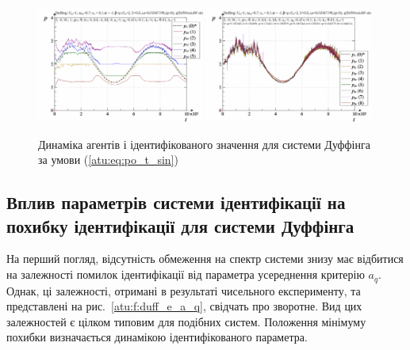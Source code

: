 \begin{figure}[ht!]
\begin{center}
  \includegraphics[width=0.49\textwidth]{p/cha/duff/duff_id-p_t_pi_ql3rlWvnAAW_sin.png}
  \hfill
  \includegraphics[width=0.49\textwidth]{p/cha/duff/duff_id-p_t_p_ql3rlWvnAAW_sin.png}
\end{center}
\caption{Динаміка агентів і ідентифікованого значення для системи Дуффінга за умови (\ref{atu:eq:po_t_sin})}
\label{atu:f:duff_id_sin}
\end{figure}



\subsection{Вплив параметрів системи ідентифікації на похибку ідентифікації для системи Дуффінга} %

На перший погляд, відсутність обмеження на спектр системи
знизу має відбитися на залежності помилок ідентифікації від
параметра усереднення критерію
$a_q$. Однак, ці залежності, отримані в результаті чисельного
експерименту, та представлені на рис.~\ref{atu:f:duff_e_a_q}, свідчать про
зворотне. Вид цих залежностей є цілком типовим для подібних
систем. Положення мінімуму похибки визначається динамікою
ідентифікованого параметра.

